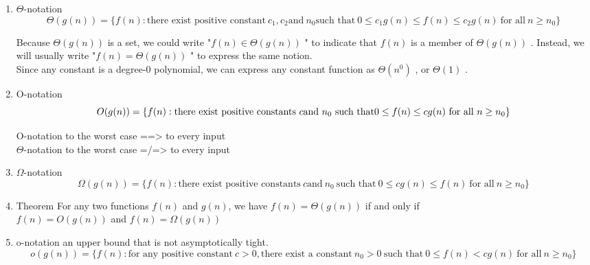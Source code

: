 \documentclass[11pt]{article}
\begin{document}
\begin{enumerate}
\item $\Theta$-notation
\label{sec-2-3-1-1}
\begin{equation}

\Theta(g(n)) = \{f(n): \text{there exist positive constant}\ c_1, c_2 \text{and} \ n_0 \text{such that} \
0 \le c_1 g(n) \le f(n) \le c_2 g(n)\  \text{for all} \ n \ge n_0 \}
\end{equation}

Because $\Theta(g(n))$ is a set, we could write "$f(n) \in \Theta(g(n))$ " to indicate that $f(n)$ is a member of $\Theta(g(n))$ . Instead, we will usually write "$f(n) = \Theta(g(n))$ " to express the same notion. \\

Since any constant is a degree-0 polynomial, we can express any constant function as $\Theta(n^0)$ , or $\Theta(1)$ . \\
\item O-notation
\label{sec-2-3-1-2}
\begin{equation}
O(g(n)) = \{f(n): \text{there exist positive constants} \ c \text{and} \ n_0 \ \text{such that} \\
0 \le f(n) \le cg(n) \ \text{for all} \ n \ge n_0 \}
\end{equation}

O-notation to the worst case ==> to every input \\
$\Theta$-notation to the worst case =/=> to every input \\
\item $\Omega$-notation
\label{sec-2-3-1-3}
\begin{equation}
\Omega(g(n)) = \{f(n): \text{there exist positive constants} \ c \text{and} \ n_0 \ \text{such that} \
0 \le cg(n) \le f(n) \ \text{for all} \ n \ge n_0 \}
\end{equation}
\item Theorem
\label{sec-2-3-1-4}
For any two functions $f(n)$ and $g(n)$, we have $f(n) = \Theta(g(n))$ if and only if \\
$f(n) = O(g(n))$ and $f(n) = \Omega(g(n))$ \\
\item o-notation
\label{sec-2-3-1-5}
an upper bound that is not asymptotically tight. \\

\begin{equation}
o(g(n)) = \{f(n): \text{for any positive constant} \ c > 0, \text{there exist a constant} \ n_0 > 0 \ \text{such that} \
0 \le f(n) < cg(n) \ \text{for all} \ n \ge n_0 \}
\end{equation}



\end{enumerate}
\end{document}
